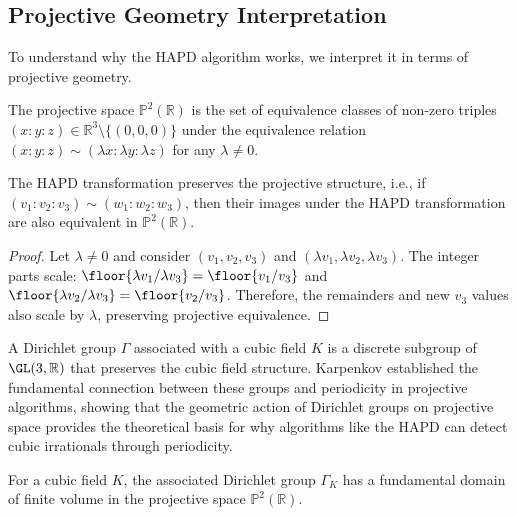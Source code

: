 \subsection{Projective Geometry Interpretation}

To understand why the HAPD algorithm works, we interpret it in terms of projective geometry.

\begin{definition}
The projective space $\mathbb{P}^2(\mathbb{R})$ is the set of equivalence classes of non-zero triples $(x : y : z) \in \mathbb{R}^3 \setminus \{(0,0,0)\}$ under the equivalence relation $(x : y : z) \sim (\lambda x : \lambda y : \lambda z)$ for any $\lambda \neq 0$.
\end{definition}

\begin{proposition}\label{prop:projective_invariance}
The HAPD transformation preserves the projective structure, i.e., if $(v_1 : v_2 : v_3) \sim (w_1 : w_2 : w_3)$, then their images under the HAPD transformation are also equivalent in $\mathbb{P}^2(\mathbb{R})$.
\end{proposition}

\begin{proof}
Let $\lambda \neq 0$ and consider $(v_1, v_2, v_3)$ and $(\lambda v_1, \lambda v_2, \lambda v_3)$. The integer parts scale: $\floor{\lambda v_1/\lambda v_3} = \floor{v_1/v_3}$ and $\floor{\lambda v_2/\lambda v_3} = \floor{v_2/v_3}$. Therefore, the remainders and new $v_3$ values also scale by $\lambda$, preserving projective equivalence.
\end{proof}

\begin{definition}
A Dirichlet group $\Gamma$ associated with a cubic field $K$ is a discrete subgroup of $\GL(3,\mathbb{R})$ that preserves the cubic field structure. Karpenkov \cite{Karpenkov2022} established the fundamental connection between these groups and periodicity in projective algorithms, showing that the geometric action of Dirichlet groups on projective space provides the theoretical basis for why algorithms like the HAPD can detect cubic irrationals through periodicity.
\end{definition}

\begin{theorem}\label{thm:finite_domain}
For a cubic field $K$, the associated Dirichlet group $\Gamma_K$ has a fundamental domain of finite volume in the projective space $\mathbb{P}^2(\mathbb{R})$.
\end{theorem}

